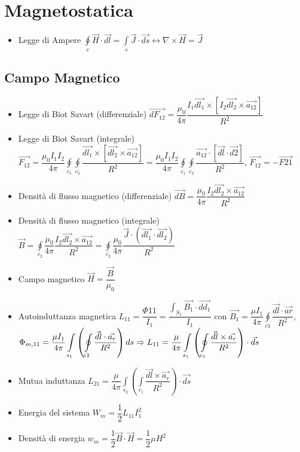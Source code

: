 \documentclass{article}
\begin{document}
\newpage

\section{Magnetostatica}
\begin{itemize}
	\item Legge di Ampere \( \displaystyle \oint\limits_{c} \vec{H} \cdot \vec{dl} = \int\limits_{s} \vec{J} \cdot \vec{ds} \leftrightarrow \nabla \times \vec{H} = \vec{J} \)
\end{itemize}

\subsection{Campo Magnetico}
\begin{itemize}
	\item Legge di Biot Savart (differenziale) \( \vec{dF_{12}} = \dfrac{\mu_0}{4 \pi} \dfrac{I_1 \vec{dl_1} \times [I_2 \vec{dl_2} \times \vec{a_{12}}] }{R^2} \)
	\item Legge di Biot Savart (integrale) \(\displaystyle \vec{F_{12}} = \dfrac{\mu_0 I_1 I_2}{4 \pi} \oint\limits_{c_1} \oint\limits_{c_2} \dfrac{\vec{dl_1} \times [\vec{dl_2} \times \vec{a_{12}}]} {R^2} = \dfrac{\mu_0 I_1 I_2}{4 \pi} \oint\limits_{c_1} \oint\limits_{c_2} \dfrac{\vec{a_{12}} \cdot [\vec{dl} \cdot \vec{d2}]} {R^2} \), \(\vec{F_{12}} = - \vec{F{21}} \)
	\item Densità di flusso magnetico (differenziale) \( \vec{dB} = \dfrac{\mu_0}{4 \pi} \dfrac{I_2 \vec{dl_2} \times \vec{a_{12}}}{R^2} \)
	\item Densità di flusso magnetico (integrale) \(\displaystyle \vec{B} = \oint\limits_{c_2} \dfrac{\mu_0}{4 \pi} \dfrac{I_2 \vec{dl_2} \times \vec{a_{12}}}{R^2} = \oint\limits_{c_2} \dfrac{\mu_0}{4 \pi} \dfrac{\vec{J} \cdot ( \vec{dl_{1}} \cdot \vec{dl_2} )}{R^2}\)
	\item Campo magnetico \( \vec{H} = \dfrac{\vec{B}}{\mu_0} \)
	\item Autoinduttanza magnetica \(\displaystyle L_{11} = \dfrac{\Phi{11}}{I_1} = \dfrac{\displaystyle  \int_{S_1} \vec{B_1} \cdot \vec{dd_1}}{I_1} \) con \( \vec{B_1} = \dfrac{\mu I_1}{4 \pi} \displaystyle \oint\limits_{c1} \dfrac{\vec{dl} \cdot \vec{ar}}{R^2} \), \(\displaystyle \Phi_{m, 11} = \dfrac{\mu I_1}{4 \pi} \int\limits_{s_1} \left( \oint\limits_{c1} \dfrac{\vec{dl} \cdot \vec{a_r}}{R^2} \right) ds \linebreak \Rightarrow L_{11} = \dfrac{\mu}{4 \pi} \displaystyle\int\limits_{s_1} \left(\displaystyle  \oint\limits_{c_1} \dfrac{\vec{dl} \times \vec{a_r}}{R^2} \right) \cdot \vec{ds}\)
	\item Mutua induttanza \(\displaystyle L_{21} = \dfrac{\mu}{4 \pi} \int\limits_{s_2} \left( \int\limits_{c_1} \dfrac{\vec{dl} \times \vec{a_r}}{R^2} \right) \cdot \vec{ds} \)
	\item Energia del sistema \( W_m = \dfrac{1}{2} L_{11} I_1^2 \)
	\item Densità di energia  \( w_m = \dfrac{1}{2} \vec{B} \cdot \vec{H} = \dfrac{1}{2} \mu H^2 \)
\end{itemize}
\end{document}

